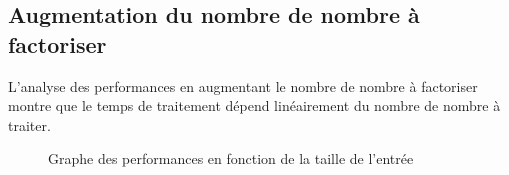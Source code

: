 \documentclass[12pt]{article}
\begin{document}
\subsection{Augmentation du nombre de nombre à factoriser}
L'analyse des performances en augmentant le nombre de nombre à factoriser montre que le temps de traitement dépend linéairement du nombre de nombre à traiter. 
\begin{figure}[!h]
\centering
{}
\caption{\label{graph2}Graphe des performances en fonction de la taille de l'entrée}
\end{figure}
\end{document}
